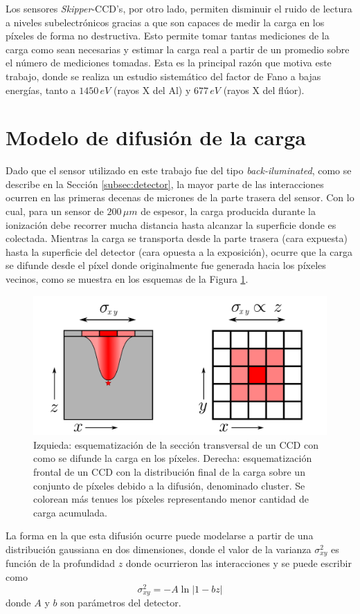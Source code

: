 Los sensores \textit{Skipper}-CCD's, por otro lado, permiten disminuir el ruido de lectura a niveles subelectrónicos gracias a que son capaces de medir la carga en los píxeles de forma no destructiva. Esto permite tomar tantas mediciones de la carga como sean necesarias y estimar la carga real a partir de un promedio sobre el número de mediciones tomadas. 
Esta es la principal razón que motiva este trabajo, donde se realiza un estudio sistemático del factor de Fano a bajas energías, tanto a $1450\,\si{eV}$ (rayos X del Al) y $677\,\si{eV}$ (rayos X del flúor).

\section{Modelo de difusión de la carga}
\noindent Dado que el sensor utilizado en este trabajo fue del tipo \textit{back-iluminated}, como se describe en la Sección \ref{subsec:detector}, la mayor parte de las interacciones ocurren en las primeras decenas de micrones de la parte trasera del sensor. Con lo cual, para un sensor de $200\,\si{\mu m}$ de espesor, la carga producida durante la ionización debe recorrer mucha distancia hasta alcanzar la superficie donde es colectada. Mientras la carga se transporta desde la parte trasera (cara expuesta) hasta la superficie del detector (cara opuesta a la exposición), ocurre que la carga se difunde desde el píxel donde originalmente fue generada hacia los píxeles vecinos, como se muestra en los esquemas de la Figura \ref{fig:difusion}.
\begin{figure}[h]
    \centering
        \includegraphics[scale=0.6]{Figs/difusion.pdf}
    \caption{Izquieda: esquematización de la sección transversal de un CCD con como se difunde la carga en los píxeles. Derecha: esquematización frontal de un CCD con la distribución final de la carga sobre un conjunto de píxeles debido a la difusión, denominado cluster. Se colorean más tenues los píxeles representando menor cantidad de carga acumulada.}
    \label{fig:difusion}
\end{figure}
La forma en la que esta difusión ocurre puede modelarse a partir de una distribución gaussiana en dos dimensiones, donde el valor de la varianza $\sigma_{xy}^{2}$ es función de la profundidad $z$ donde ocurrieron las interacciones y se puede escribir como
\begin{equation*}
    \sigma_{xy}^{2} = -A\ln{|1-bz|}
\end{equation*}
donde $A$ y $b$ son parámetros del detector.

